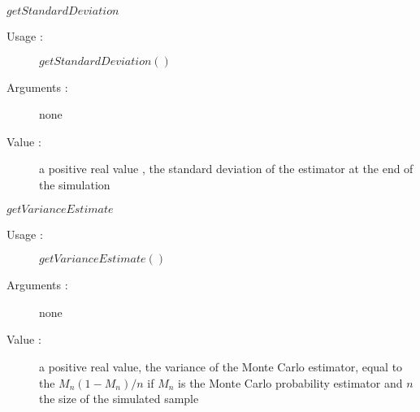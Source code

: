 \begin{description}
\begin{description}
  \item $getStandardDeviation$
    \begin{description}
    \item[Usage :] $getStandardDeviation()$
    \item[Arguments :] none
    \item[Value :]  a positive real value , the standard deviation  of the estimator at the end of the simulation
    \end{description}
    \bigskip

  \item $getVarianceEstimate$
    \begin{description}
    \item[Usage :] $getVarianceEstimate()$
    \item[Arguments :] none
    \item[Value :]  a positive real value, the variance of the Monte Carlo estimator, equal to the $M_n(1-M_n) / n$ if $M_n$ is the Monte Carlo probability estimator and $n$ the size of the simulated sample
    \end{description}
    \bigskip
  \end{description}

\end{description}


